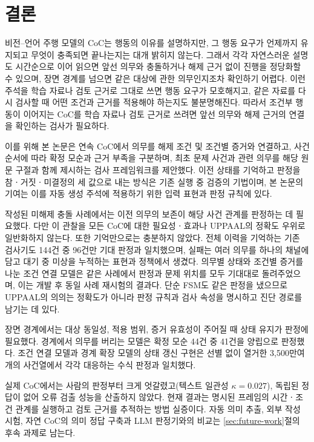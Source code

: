 \section{결론}
\label{sec:conclusion}

\begin{revision}

비전--언어 주행 모델의 CoC는 행동의 이유를 설명하지만, 그 행동 요구가 언제까지 유지되고 무엇이 충족되면 끝나는지는 대개 밝히지 않는다. 그래서 각각 자연스러운 설명도 시간순으로 이어 읽으면 앞선 의무와 충돌하거나 해제 근거 없이 진행을 정당화할 수 있으며, 장면 경계를 넘으면 같은 대상에 관한 의무인지조차 확인하기 어렵다. 이런 주석을 학습 자료나 검토 근거로 그대로 쓰면 행동 요구가 모호해지고, 같은 자료를 다시 검사할 때 어떤 조건과 근거를 적용해야 하는지도 불분명해진다. 따라서 조건부 행동이 이어지는 CoC를 학습 자료나 검토 근거로 쓰려면 앞선 의무와 해제 근거의 연결을 확인하는 검사가 필요하다.

이를 위해 본 논문은 연속 CoC에서 의무를 해제 조건 및 조건별 증거와 연결하고, 사건 순서에 따라 확정 모순과 근거 부족을 구분하며, 최초 문제 사건과 관련 의무를 해당 원문 구절과 함께 제시하는 검사 프레임워크를 제안했다. 이전 상태를 기억하고 판정을 참ㆍ거짓ㆍ미결정의 세 값으로 내는 방식은 기존 실행 중 검증의 기법이며, 본 논문의 기여는 이를 자동 생성 주석에 적용하기 위한 입력 표현과 판정 규칙에 있다.

작성된 미해제 충돌 사례에서는 이전 의무의 보존이 해당 사건 관계를 판정하는 데 필요했다. 다만 이 관찰을 모든 CoC에 대한 필요성ㆍ효과나 UPPAAL의 정확도 우위로 일반화하지 않는다. 또한 기억만으로는 충분하지 않았다. 전체 이력을 기억하는 기존 검사기도 144건 중 96건만 기대 판정과 일치했으며, 실패는 여러 의무를 하나의 채널에 담고 대기 중 미상을 누적하는 표현과 정책에서 생겼다. 의무별 상태와 조건별 증거를 나눈 조건 연결 모델은 같은 사례에서 판정과 문제 위치를 모두 기대대로 돌려주었으며, 이는 개발 후 동일 사례 재시험의 결과다. 단순 FSM도 같은 판정을 냈으므로 UPPAAL의 의의는 정확도가 아니라 판정 규칙과 검사 속성을 명시하고 진단 경로를 남기는 데 있다.

장면 경계에서는 대상 동일성, 적용 범위, 증거 유효성이 주어질 때 상태 유지가 판정에 필요했다. 경계에서 의무를 버리는 모델은 확정 모순 44건 중 41건을 양립으로 판정했다. 조건 연결 모델과 경계 확장 모델의 상태 갱신 구현은 선별 없이 열거한 3,500만여 개의 사건열에서 각각 대응하는 수식 판정과 일치했다.

실제 CoC에서는 사람의 판정부터 크게 엇갈렸고(텍스트 일관성 $\kappa=0.027$), 독립된 정답이 없어 오류 검출 성능을 산출하지 않았다. 현재 결과는 명시된 프레임의 시간ㆍ조건 관계를 실행하고 검토 근거를 추적하는 방법 실증이다. 자동 의미 추출, 외부 작성 시험, 자연 CoC의 의미 정답 구축과 LLM 판정기와의 비교는 \ref{sec:future-work}절의 후속 과제로 남는다.
\end{revision}
